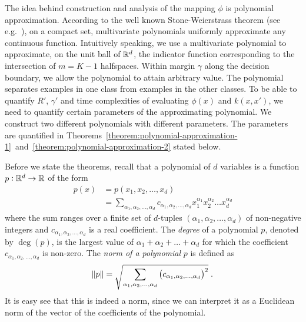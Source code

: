 The idea behind construction and analysis of the mapping $\phi$ is polynomial
approximation. According to the well known Stone-Weierstrass theorem (see
e.g.~\citet[Section~10.10]{Davidson-Donsig-2010}), on a compact set,
multivariate polynomials uniformly approximate any continuous function.
Intuitively speaking, we use a multivariate polynomial to approximate, on the
unit ball of $\mathbb{R}^d$, the indicator function corresponding to the intersection of
$m=K-1$ halfspaces. Within margin $\gamma$ along the decision boundary, we allow
the polynomial to attain arbitrary value. The polynomial separates examples in
one class from examples in the other classes. To be able to quantify $R'$,
$\gamma'$ and time complexities of evaluating $\phi(x)$ and $k(x,x')$, we need
to quantify certain parameters of the approximating polynomial. We construct two
different polynomials with different parameters. The parameters are quantified
in
Theorems~\ref{theorem:polynomial-approximation-1}~and~\ref{theorem:polynomial-approximation-2}
stated below.

Before we state the theorems, recall that a polynomial of $d$ variables is a
function $p:\mathbb{R}^d \to \mathbb{R}$ of the form
\begin{align*}
p(x)
& = p(x_1, x_2, \dots, x_d) \\
& = \sum_{\alpha_1, \alpha_2, \dots, \alpha_d} c_{\alpha_1, \alpha_2, \dots, \alpha_d} x_1^{\alpha_1} x_2^{\alpha_2} \dots x_d^{\alpha_d}
\end{align*}
where the sum ranges over a finite set of $d$-tuples $(\alpha_1, \alpha_2,
\dots, \alpha_d)$ of non-negative integers and $c_{\alpha_1, \alpha_2, \dots,
\alpha_d}$ is a real coefficient. The \emph{degree} of a polynomial $p$, denoted
by $\deg(p)$, is the largest value of $\alpha_1 + \alpha_2 + \dots + \alpha_d$
for which the coefficient $c_{\alpha_1, \alpha_2, \dots, \alpha_d}$ is non-zero.
The \emph{norm of a polynomial} $p$ is defined as
$$
\norm{p} = \sqrt{\sum_{\alpha_1, \alpha_2, \dots, \alpha_d} \left(c_{\alpha_1, \alpha_2, \dots, \alpha_d} \right)^2 } \; .
$$
It is easy see that this is indeed a norm, since we can interpret it as a
Euclidean norm of the vector of the coefficients of the polynomial.

